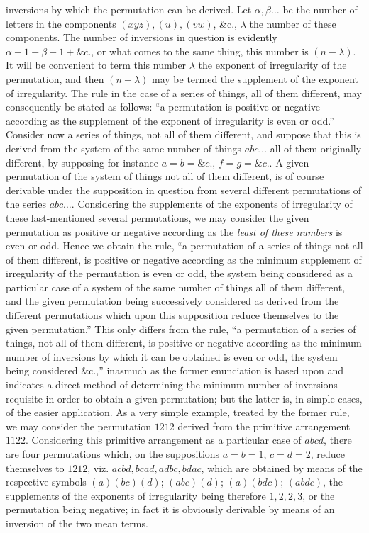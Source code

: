 \documentclass[10pt]{article}
\newcommand{\qedpage}{\vfill\pagebreak}
\begin{document}
inversions by which the permutation can be derived. Let $\alpha,\beta\ldots$ be the
number of letters in the components $(xyz),(u),(vw)$, \&c., $\lambda$ the number of
these components. The number of inversions in question is evidently
$\alpha-1+\beta-1+\&c.$, or what comes to the same thing, this number is
$(n-\lambda)$. It will be convenient to term this number $\lambda$ the exponent of
irregularity of the permutation, and then $(n-\lambda)$ may be termed the supplement
of the exponent of irregularity. The rule in the case of a series of things, all of
them different, may consequently be stated as follows: ``a permutation is positive or
negative according as the supplement of the exponent of irregularity is even or
odd.'' Consider now a series of things, not all of them different, and suppose that
this is derived from the system of the same number of things $abc\ldots$ all of them
originally different, by supposing for instance $a=b=\&c.$, $f=g=\&c.$. A given
permutation of the system of things not all of them different, is of course derivable
under the supposition in question from several different permutations of the series
$abc\ldots$. Considering the supplements of the exponents of irregularity of these
last-mentioned several permutations, we may consider the given permutation as
positive or negative according as the \textit{least of these numbers} is even or odd.
Hence we obtain the rule, ``a permutation of a series of things not all of them
different, is positive or negative according as the minimum supplement of irregularity
of the permutation is even or odd, the system being considered as a particular case
of a system of the same number of things all of them different, and the given
permutation being successively considered as derived from the different permutations
which upon this supposition reduce themselves to the given permutation.'' This only
differs from the rule, ``a permutation of a series of things, not all of them
different, is positive or negative according as the minimum number of inversions by
which it can be obtained is even or odd, the system being considered \&c.,''
inasmuch as the former enunciation is based upon and indicates a direct method of
determining the minimum number of inversions requisite in order to obtain a given
permutation; but the latter is, in simple cases, of the easier application. As a very
simple example, treated by the former rule, we may consider the permutation $1212$
derived from the primitive arrangement $1122$. Considering this primitive arrangement
as a particular case of $abcd$, there are four permutations which, on the suppositions
$a=b=1$, $c=d=2$, reduce themselves to $1212$, viz. $acbd,bcad,adbc,bdac$, which
are obtained by means of the respective symbols $(a)(bc)(d)$; $(abc)(d)$; $(a)(bdc)$;
$(abdc)$, the supplements of the exponents of irregularity being therefore $1,2,2,3$,
or the permutation being negative; in fact it is obviously derivable by means of an
inversion of the two mean terms.
\qedpage
\end{document}

